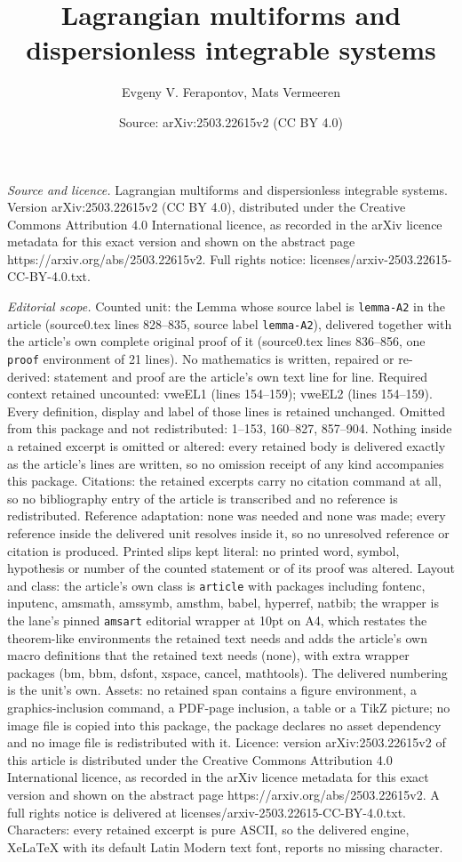 \documentclass[10pt,a4paper]{amsart}
\title[Lagrangian multiforms and dispersionless integrable systems]{Lagrangian multiforms and dispersionless integrable systems}
\author{Evgeny V. Ferapontov, Mats Vermeeren}
\date{Source: arXiv:2503.22615v2 (CC BY 4.0)}
\begin{document}
\maketitle

\noindent\emph{Source and licence.} Lagrangian multiforms and dispersionless integrable systems. Version arXiv:2503.22615v2 (CC BY 4.0), distributed under the Creative Commons Attribution 4.0 International licence, as recorded in the arXiv licence metadata for this exact version and shown on the abstract page https://arxiv.org/abs/2503.22615v2. Full rights notice: licenses/arxiv-2503.22615-CC-BY-4.0.txt.\par\smallskip

\noindent\textit{Editorial scope.} Counted unit: the Lemma whose source label is \texttt{lemma-A2} in the article (source0.tex lines 828--835, source label \texttt{lemma-A2}), delivered together with the article's own complete original proof of it (source0.tex lines 836--856, one \texttt{proof} environment of 21 lines). No mathematics is written, repaired or re-derived: statement and proof are the article's own text line for line. Required context retained uncounted: vweEL1 (lines 154--159); vweEL2 (lines 154--159). Every definition, display and label of those lines is retained unchanged. Omitted from this package and not redistributed: 1--153, 160--827, 857--904. Nothing inside a retained excerpt is omitted or altered: every retained body is delivered exactly as the article's lines are written, so no omission receipt of any kind accompanies this package. Citations: the retained excerpts carry no citation command at all, so no bibliography entry of the article is transcribed and no reference is redistributed. Reference adaptation: none was needed and none was made; every reference inside the delivered unit resolves inside it, so no unresolved reference or citation is produced. Printed slips kept literal: no printed word, symbol, hypothesis or number of the counted statement or of its proof was altered. Layout and class: the article's own class is \texttt{article} with packages including fontenc, inputenc, amsmath, amssymb, amsthm, babel, hyperref, natbib; the wrapper is the lane's pinned \texttt{amsart} editorial wrapper at 10pt on A4, which restates the theorem-like environments the retained text needs and adds the article's own macro definitions that the retained text needs (none), with extra wrapper packages (bm, bbm, dsfont, xspace, cancel, mathtools). The delivered numbering is the unit's own. Assets: no retained span contains a figure environment, a graphics-inclusion command, a PDF-page inclusion, a table or a TikZ picture; no image file is copied into this package, the package declares no asset dependency and no image file is redistributed with it. Licence: version arXiv:2503.22615v2 of this article is distributed under the Creative Commons Attribution 4.0 International licence, as recorded in the arXiv licence metadata for this exact version and shown on the abstract page https://arxiv.org/abs/2503.22615v2. A full rights notice is delivered at licenses/arxiv-2503.22615-CC-BY-4.0.txt. Characters: every retained excerpt is pure ASCII, so the delivered engine, XeLaTeX with its default Latin Modern text font, reports no missing character.
\end{document}
